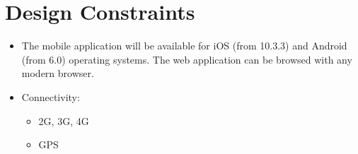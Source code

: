\section{Design Constraints}
\begin{itemize}

\item The mobile application will be available for iOS (from 10.3.3) and Android (from 6.0) operating systems.
The web application can be browsed with any modern browser. 
\item 
Connectivity: \\
\begin{itemize}
\item 2G, 3G, 4G
\item GPS
\end{itemize}

\end{itemize}

